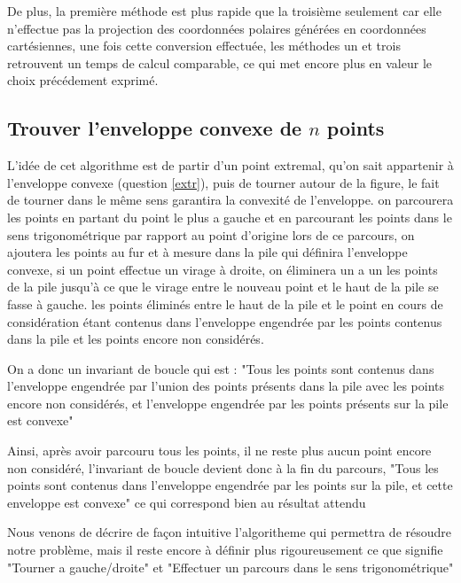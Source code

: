 \documentclass[a4paper,12pt,twoside]{article}
\begin{document}
		De plus, la première méthode est plus rapide que la troisième seulement car elle n'effectue pas la projection des coordonnées polaires générées en coordonnées cartésiennes, une fois cette conversion effectuée, les méthodes un et trois retrouvent un temps de calcul comparable, ce qui met encore plus en valeur le choix précédement exprimé.

	\subsection{Trouver l'enveloppe convexe de $n$ points}

		L'idée de cet algorithme est de partir d'un point extremal, qu'on sait appartenir à l'enveloppe convexe (question \ref{extr}), puis de tourner autour de la figure, le fait de tourner dans le même sens garantira la convexité de l'enveloppe. on parcourera les points en partant du point le plus a gauche et en parcourant les points dans le sens trigonométrique par rapport au point d'origine lors de ce parcours, on ajoutera les points au fur et à mesure dans la pile qui définira l'enveloppe convexe, si un point effectue un virage à droite, on éliminera un a un les points de la pile jusqu'à ce que le virage entre le nouveau point et le haut de la pile se fasse à gauche. les points éliminés entre le haut de la pile et le point en cours de considération étant contenus dans l'enveloppe engendrée par les points contenus dans la pile et les points encore non considérés.  

		On a donc un invariant de boucle qui est : "Tous les points sont contenus dans l'enveloppe engendrée par l'union des points présents dans la pile avec les points encore non considérés, et l'enveloppe engendrée par les points présents sur la pile est convexe" 

		Ainsi, après avoir parcouru tous les points, il ne reste plus aucun point encore non considéré, l'invariant de boucle devient donc à la fin du parcours, "Tous les points sont contenus dans l'enveloppe engendrée par les points sur la pile, et cette enveloppe est convexe" ce qui correspond bien au résultat attendu

		Nous venons de décrire de façon intuitive l'algoritheme qui permettra de résoudre notre problème, mais il reste encore à définir plus rigoureusement ce que signifie "Tourner a gauche/droite" et "Effectuer un parcours dans le sens trigonométrique"
\end{document}
